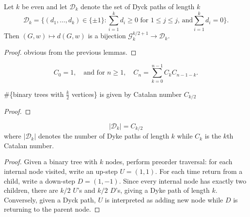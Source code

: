\begin{lemma}
    \notready
    \label{lem:walk_to_Dyck_paths_bijection}
  Let $k$ be even and let $\mathcal{D}_k$ denote the set of Dyck paths of length $k$
  \[ \mathcal{D}_k = \{(d_1,\ldots,d_k)\in\{\pm 1\}\colon \sum_{i=1}^k d_i\ge 0\text{ for }1\le j\le j\text{, and}\sum_{i=1}^kd_i=0\}. \]
  Then $(G,w)\mapsto {d}(G,w)$ is a bijection $\mathcal{G}_k^{k/2+1}\to\mathcal{D}_k$.
  \begin{proof}
    \notready
    obvious from the previous lemmas.
  \end{proof}
\end{lemma}

\begin{definition}
    \notready
    \label{def:Catalan_number}
  \[C_0 = 1, \quad \text{and for } n \geq 1, \quad C_n = \sum_{k=0}^{n-1} C_k C_{n-1-k}.\]
\end{definition}


\begin{lemma}
    \notready
    \label{lem:binary_tree_Catalan_number}
  \#\{binary trees with $\frac{k}{2}$ vertices\} is given by Catalan number $C_{k / 2}$
  \begin{proof}
    \notready
  \end{proof}
\end{lemma}


\begin{proposition}
    \notready
    \label{prop:Catalan_Dyck_samecardinality}
  \[|\mathcal{D}_k| = C_{k/2} \] where $|\mathcal{D}_k|$ denotes the number of Dyke paths of length $k$ while
  $C_k$ is the $k$th Catalan number.
  \begin{proof}
    \notready
    Given a binary tree with $k$ nodes, perform preorder traversal: for each internal node visited, write
    an up-step \(U = (1,1)\). For each time return from a child, write a down-step \(D = (1,-1)\).
    Since every internal node has exactly two children, there are \(k/2\) \(U\)'s and \(k/2\) \(D\)'s,
    giving a Dyke path of length \(k\). Conversely, given a Dyck path, $U$ is interpreted as adding new node
    while $D$ is returning to the parent node.
  \end{proof}
\end{proposition}

